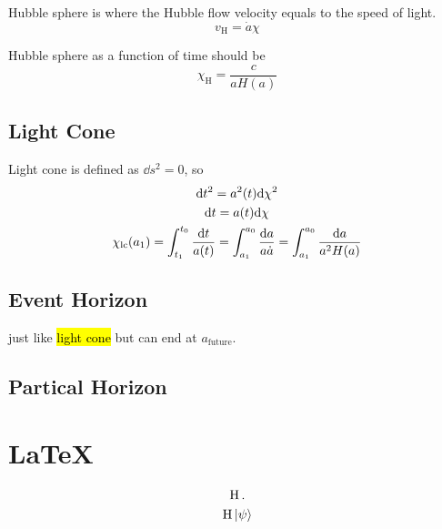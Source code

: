 Hubble sphere is where the Hubble flow velocity equals to the speed of light. 
\begin{equation}
    v_{\mathrm{H}} = \dot{a} \chi  
\end{equation}

Hubble sphere as a function of time should be 
\begin{equation}
    \chi_{\mathrm{H}} =\frac{c}{a H(a)}
\end{equation}

\subsection{Light Cone}

Light cone is defined as $\dd s^2 = 0$, so 
\begin{gather}
    \dd t^2 = a^2(t) \dd \chi^2 \\ 
    \dd t = a(t) \dd \chi \\ 
    \chi_{\rm lc}(a_1) = \int_{t_1}^{t_0} \frac{\dd t}{a(t)} = \int_{a_1}^{a_0} \frac{\dd a }{a \dot{a}} = \int_{a_1}^{a_0} \frac{\dd a }{a^2 H(a)} 
\end{gather} 


\subsection{Event Horizon}

just like \hl{light cone} but can end at $a_{\mathrm{future}}$. 

\subsection{Partical Horizon}

\section*{\LaTeX}


\begin{gather}
    \operatorname{H}.\\
    \operatorname{H} \ket{\psi}
\end{gather}




